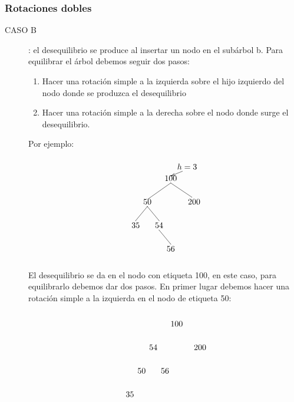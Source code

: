 \documentclass[10pt,a4paper,spanish]{report}
\begin{document}
\subsubsection{\textcolor[rgb]{0.3,0.4,0.8}Rotaciones dobles}
\begin{description}
	\item[CASO B]: el desequilibrio se produce al insertar un nodo en el subárbol b. Para equilibrar el árbol debemos seguir dos pasos:
	\begin{enumerate}
	 	\item Hacer una rotación simple a la izquierda sobre el hijo izquierdo del nodo donde se produzca el desequilibrio
	 	\item Hacer una rotación simple a la derecha sobre el nodo donde surge el desequilibrio.
	\end{enumerate}

	\noindent
	Por ejemplo:
	\[\begin{xy}
	,(0,0)*+=<10mm>[]\txt<2cm>{100}
	,(7,5)*+=<10mm>[]\txt<2cm>{$h=3$}
	,(-10,-10)*+=<10mm>[]\txt<2cm>{50}
	,(10,-10)*+=<10mm>[]\txt<2cm>{200}
	,(-15,-20)*+=<10mm>[]\txt<2cm>{35}
	,(-5,-20)*+=<10mm>[]\txt<2cm>{54}
	,(0,-30)*+=<10mm>[]\txt<2cm>{56}

	\ar@{->} (5,3);(0,1)
	\ar@{-} (0,-2);(-10,-9) %
	\ar@{-} (0,-2);(9,-8) %
	\ar@{-} (-10,-12);(-15,-18) %
	\ar@{-} (-10,-12);(-5,-18) %
	\ar@{-} (-5,-22);(0,-28)
	\end{xy}\]

	\noindent
	El desequilibrio se da en el nodo con etiqueta 100, en este caso, para equilibrarlo debemos dar dos pasos. En primer lugar debemos hacer una rotación simple a la izquierda en el nodo de etiqueta 50:

	\[\begin{xy}
	,(0,0)*+=<10mm>[]\txt<2cm>{100}
	,(-10,-10)*+=<10mm>[]\txt<2cm>{54}
	,(10,-10)*+=<10mm>[]\txt<2cm>{200}
	,(-15,-20)*+=<10mm>[]\txt<2cm>{50}
	,(-5,-20)*+=<10mm>[]\txt<2cm>{56}
	,(-20,-30)*+=<10mm>[]\txt<2cm>{35}


\end{xy}\]
\end{description}
\end{document}
